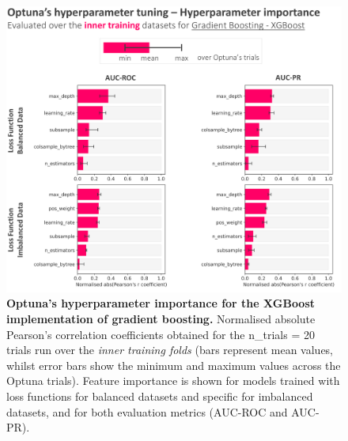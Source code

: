 \begin{figure}[htbp]
\centering
\includegraphics[scale=0.9]{optuna_parameters_importance_gradient_boosting_xgboost.png}
\caption{\textbf{Optuna's hyperparameter importance for the XGBoost implementation of gradient boosting.} Normalised absolute Pearson's correlation coefficients obtained for the n\_trials = 20 trials run over the \textcolor{colourInnerTraining}{\textit{inner training folds}} (bars represent mean values, whilst error bars show the minimum and maximum values across the Optuna trials). Feature importance is shown for models trained with loss functions for balanced datasets and specific for imbalanced datasets, and for both evaluation metrics (AUC-ROC and AUC-PR).}
\label{fig:optuna_parameters_importance_gradient_boosting_xgboost}
\end{figure}

